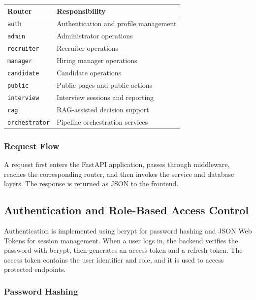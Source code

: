 \begin{center}
\label{tab:api_routers}
\renewcommand{\arraystretch}{0.8}
\begin{tabularx}{\textwidth}{|l|l|}
\hline
\rowcolor{gray!20} \textbf{Router} & \textbf{Responsibility} \\
\hline
\texttt{auth} & Authentication and profile management \\
\hline
\texttt{admin} & Administrator operations \\
\hline
\texttt{recruiter} & Recruiter operations \\
\hline
\texttt{manager} & Hiring manager operations \\
\hline
\texttt{candidate} & Candidate operations \\
\hline
\texttt{public} & Public pages and public actions \\
\hline
\texttt{interview} & Interview sessions and reporting \\
\hline
\texttt{rag} & RAG-assisted decision support \\
\hline
\texttt{orchestrator} & Pipeline orchestration services \\
\hline
\end{tabularx}
\end{center}

\subsubsection{Request Flow}

A request first enters the FastAPI application, passes through middleware, reaches the corresponding router, and then invokes the service and database layers. The response is returned as JSON to the frontend.

\subsection{Authentication and Role-Based Access Control}

Authentication is implemented using bcrypt for password hashing and JSON Web Tokens for session management. When a user logs in, the backend verifies the password with bcrypt, then generates an access token and a refresh token. The access token contains the user identifier and role, and it is used to access protected endpoints.

\subsubsection{Password Hashing}

